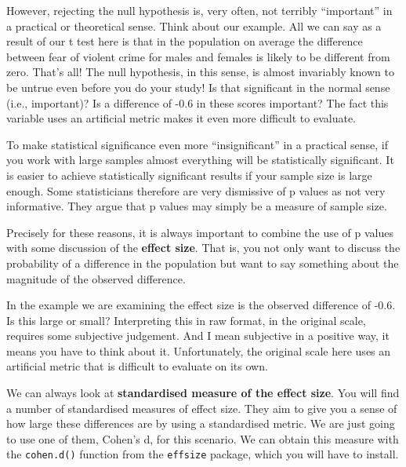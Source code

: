 \documentclass[
]{book}
\newenvironment{Shaded}{\begin{snugshade}}{\end{snugshade}}
\newcommand{\FunctionTok}[1]{\textcolor[rgb]{0.13,0.29,0.53}{\textbf{#1}}}
\newcommand{\NormalTok}[1]{#1}
\newcommand{\SpecialCharTok}[1]{\textcolor[rgb]{0.81,0.36,0.00}{\textbf{#1}}}
\begin{document}
However, rejecting the null hypothesis is, very often, not terribly ``important'' in a practical or theoretical sense. Think about our example. All we can say as a result of our t test here is that in the population on average the difference between fear of violent crime for males and females is likely to be different from zero. That's all! The null hypothesis, in this sense, is almost invariably known to be untrue even before you do your study! Is that significant in the normal sense (i.e., important)? Is a difference of -0.6 in these scores important? The fact this variable uses an artificial metric makes it even more difficult to evaluate.

To make statistical significance even more ``insignificant'' in a practical sense, if you work with large samples almost everything will be statistically significant. It is easier to achieve statistically significant results if your sample size is large enough. Some statisticians therefore are very dismissive of p values as not very informative. They argue that p values may simply be a measure of sample size.

Precisely for these reasons, it is always important to combine the use of p values with some discussion of the \textbf{effect size}. That is, you not only want to discuss the probability of a difference in the population but want to say something about the magnitude of the observed difference.

In the example we are examining the effect size is the observed difference of -0.6. Is this large or small? Interpreting this in raw format, in the original scale, requires some subjective judgement. And I mean subjective in a positive way, it means you have to think about it. Unfortunately, the original scale here uses an artificial metric that is difficult to evaluate on its own.

We can always look at \textbf{standardised measure of the effect size}. You will find a number of standardised measures of effect size. They aim to give you a sense of how large these differences are by using a standardised metric. We are just going to use one of them, Cohen's d, for this scenario. We can obtain this measure with the \texttt{cohen.d()} function from the \texttt{effsize} package, which you will have to install.

\begin{Shaded}
\end{Shaded}
\end{document}
